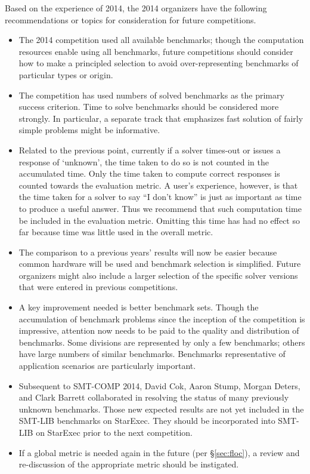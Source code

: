 \documentclass[twoside,11pt]{article}
\begin{document}
Based on the experience of 2014, the 2014 organizers have the following recommendations or topics for consideration for future competitions.
\begin{itemize}
\item The 2014 competition used all available benchmarks; though the computation resources enable using all benchmarks, future competitions should consider how to make a principled selection to avoid over-representing benchmarks of particular types or origin.
\item The competition has used numbers of solved benchmarks as the primary success criterion. Time to solve benchmarks should be considered more strongly. In particular, a separate track that emphasizes fast solution of fairly simple problems might be informative.
\item Related to the previous point, currently if a solver times-out or issues a response of `unknown', the time taken to do so is not counted in the accumulated time. Only the time taken to compute correct responses is counted towards the evaluation metric.
A user's experience, however, is that the time taken for a solver to say ``I don't know'' is just as important as time to produce a useful answer. Thus we recommend that such
computation time be included in the evaluation metric. Omitting this time has had no effect so far because time was little used in the overall metric.
\item The comparison to a previous years' results will now be easier because common hardware will be used and benchmark selection is simplified. Future organizers might also include a larger selection of the specific solver versions that were entered in previous competitions. 
\item A key improvement needed is better benchmark sets. Though the accumulation of benchmark problems since the inception of the competition is impressive, attention now needs to be paid to the quality and distribution of benchmarks. Some divisions are represented by only a few benchmarks; others have large numbers of similar benchmarks.
Benchmarks representative of application scenarios are particularly important.
\item Subsequent to SMT-COMP 2014, David Cok, Aaron Stump, Morgan Deters, and Clark Barrett collaborated in resolving the status of many previously unknown benchmarks. Those new expected results are not yet included in the SMT-LIB benchmarks on StarExec. They should be incorporated into SMT-LIB on StarExec prior to the next competition.
\item If a global metric is needed again in the future (per \S\ref{sec:floc}), a review and re-discussion of the appropriate metric should be instigated.

\end{itemize}
\end{document}
